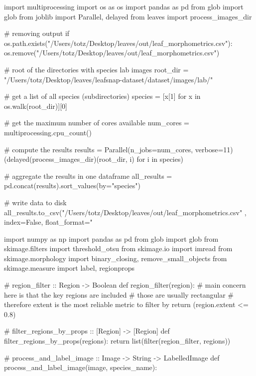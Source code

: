 \setupcolors[state=start]

\subject{main.py}

\startPYTHON
import multiprocessing
import os     as os
import pandas as pd
from   glob   import glob
from   joblib import Parallel, delayed
from   leaves import process_images_dir

# removing output
if os.path.exists("/Users/totz/Desktop/leaves/out/leaf_morphometrics.csv"):
    os.remove("/Users/totz/Desktop/leaves/out/leaf_morphometrics.csv")

# root of the directories with species lab images
root_dir = "/Users/totz/Desktop/leaves/leafsnap-dataset/dataset/images/lab/"

# get a list of all species (subdirectories)
species = [x[1] for x in os.walk(root_dir)][0]

# get the maximum number of cores available
num_cores = multiprocessing.cpu_count()

# compute the results
results = Parallel(n_jobs=num_cores, verbose=11)
            (delayed(process_images_dir)(root_dir, i) for i in species)

# aggregate the results in one dataframe
all_results = pd.concat(results).sort_values(by="species")

# write data to disk
all_results.to_csv("/Users/totz/Desktop/leaves/out/leaf_morphometrics.csv"
                  , index=False, float_format="%
\stopPYTHON

\subject{leaves.py}

\startPYTHON
import numpy              as np
import pandas             as pd
from   glob               import glob
from   skimage.filters    import threshold_otsu
from   skimage.io         import imread
from   skimage.morphology import binary_closing, remove_small_objects
from   skimage.measure    import label, regionprops


# region_filter :: Region -> Boolean
def region_filter(region):
    # main concern here is that the key regions are included
    # those are usually rectangular
    # therefore extent is the most reliable metric to filter by
    return (region.extent <= 0.8)


# filter_regions_by_props :: [Region] -> [Region]
def filter_regions_by_props(regions):
    return list(filter(region_filter, regions))


# process_and_label_image :: Image -> String -> LabelledImage
def process_and_label_image(image, species_name):

